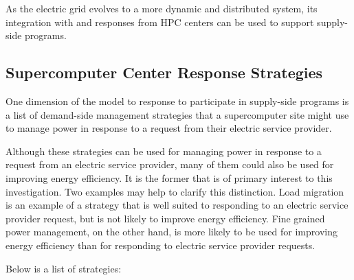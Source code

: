 As the electric grid evolves to a more dynamic and distributed system, its integration with and responses from 
HPC centers can be used to support supply-side programs.

\subsection{Supercomputer Center Response Strategies}

One dimension of the model to response to participate in supply-side programs is a list of demand-side 
management strategies 
that a supercomputer site might use to manage power in response to a request from their electric service provider. 

Although these strategies can be used for managing power in response to a
request from an electric service provider, many of them could also be used
for improving energy efficiency. It is the former that is of primary
interest to this investigation. Two examples may help to clarify this
distinction. Load migration is an example of a strategy that is well suited
to responding to an electric service provider request, but is not likely to
improve energy efficiency. Fine grained power management, on the other hand,
is more likely to be used for improving energy efficiency than for
responding to electric service provider requests.

Below is a list of strategies:

